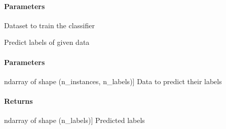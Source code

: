 \documentclass[letterpaper,10pt,english]{sphinxmanual}
\begin{document}
\begin{fulllineitems}
\begin{fulllineitems}
\paragraph{Parameters}
\label{\detokenize{classifier/mimlTOmi/_autosummary/miml.classifier.mimlTOmi.miml_to_mi_classifier.MIMLtoMIClassifier:id2}}\begin{description}
\sphinxAtStartPar
Dataset to train the classifier

\end{description}

\end{fulllineitems}


\begin{fulllineitems}
\label{\detokenize{classifier/mimlTOmi/_autosummary/miml.classifier.mimlTOmi.miml_to_mi_classifier.MIMLtoMIClassifier:miml.classifier.mimlTOmi.miml_to_mi_classifier.MIMLtoMIClassifier.predict}}
\pysigstartsignatures
{}
\pysigstopsignatures
\sphinxAtStartPar
Predict labels of given data


\paragraph{Parameters}
\label{\detokenize{classifier/mimlTOmi/_autosummary/miml.classifier.mimlTOmi.miml_to_mi_classifier.MIMLtoMIClassifier:id3}}\begin{description}
\sphinxlineitem{x}{[}ndarray of shape (n\_instances, n\_labels){]}
\sphinxAtStartPar
Data to predict their labels

\end{description}


\paragraph{Returns}
\label{\detokenize{classifier/mimlTOmi/_autosummary/miml.classifier.mimlTOmi.miml_to_mi_classifier.MIMLtoMIClassifier:id4}}\begin{description}
\sphinxlineitem{results}{[}ndarray of shape (n\_labels){]}
\sphinxAtStartPar
Predicted labels


\end{description}
\end{fulllineitems}
\end{fulllineitems}
\end{document}
